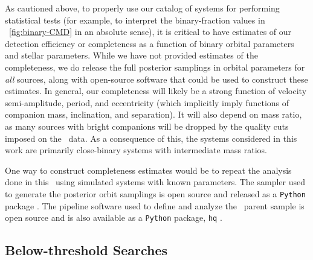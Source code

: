 \documentclass[modern]{aastex63}
\begin{document}
As cautioned above, to properly use our catalog of systems for performing
statistical tests (for example, to interpret the binary-fraction values in
\figurename~\ref{fig:binary-CMD} in an absolute sense), it is critical to have
estimates of our detection efficiency or completeness as a function of binary
orbital parameters and stellar parameters.
While we have not provided estimates of the completeness, we do release the full
posterior samplings in orbital parameters for \emph{all} sources, along with
open-source software that could be used to construct these estimates.
In general, our completeness will likely be a strong function of velocity
semi-amplitude, period, and eccentricity (which implicitly imply functions of
companion mass, inclination, and separation).
It will also depend on mass ratio, as many sources with bright companions will
be dropped by the quality cuts imposed on the \apogee\ data.
As a consequence of this, the systems considered in this work are primarily
close-binary systems with intermediate mass ratios.

One way to construct completeness estimates would be to repeat the analysis done
in this \documentname\ using simulated systems with known parameters.
The sampler used to generate the posterior orbit samplings is open source and
released as a \texttt{Python} package \citep{thejoker, Price-Whelan:2019a}.
The pipeline software used to define and analyze the \apogee\ parent sample is
open source and is also available as a \texttt{Python} package, \texttt{hq}
\citep{Price-Whelan:2019}.



\subsection{Below-threshold Searches}
\label{sec:subthreshold}
\end{document}
